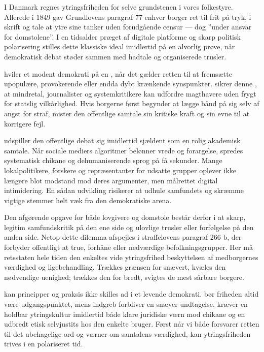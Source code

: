 I Danmark regnes ytringsfriheden for selve grundstenen i vores folkestyre. Allerede i 1849 gav Grundlovens paragraf 77 enhver borger ret til frit på tryk, i skrift og tale at ytre sine tanker uden forudgående censur --- dog ”under ansvar for domstolene”. I en tidsalder præget af digitale platforme og skarp politisk polarisering stilles dette klassiske ideal imidlertid på en alvorlig prøve, når demokratisk debat støder sammen med hadtale og organiserede trusler.

 hviler et modent demokrati på en , når det gælder retten til at fremsætte upopulære, provokerende eller endda dybt krænkende synspunkter.  sikrer denne , at mindretal, journalister og systemkritikere kan udfordre magthavere uden frygt for statslig vilkårlighed. Hvis borgerne først begynder at lægge bånd på sig selv af angst for straf, mister den offentlige samtale sin kritiske kraft og sin evne til at korrigere fejl.

 udspiller den offentlige debat sig imidlertid sjældent som en rolig akademisk samtale. Når sociale mediers algoritmer belønner vrede og forargelse, spredes systematisk chikane og dehumaniserende sprog på få sekunder. Mange lokalpolitikere, forskere og repræsentanter for udsatte grupper oplever ikke længere blot modstand mod deres argumenter, men målrettet digital intimidering. En sådan udvikling risikerer at udhule samfundets  og skræmme vigtige stemmer helt væk fra den demokratiske arena.

Den afgørende opgave for både lovgivere og domstole består derfor i at  skarp, legitim samfundskritik på den ene side og ulovlige trusler eller forfølgelse på den anden side. Netop dette dilemma afspejles i straffelovens paragraf 266 b, der forbyder offentligt at true, forhåne eller nedværdige befolkningsgrupper. Her må retsstaten hele tiden  den enkeltes vide ytringsfrihed  beskyttelsen af medborgernes værdighed og ligebehandling. Trækkes grænsen for snævert, kvæles den nødvendige uenighed; trækkes den for bredt, svigtes de mest sårbare borgere.

 kan principper og praksis ikke skilles ad i et levende demokrati.  bør friheden altid være udgangspunktet, mens indgreb forbliver en snæver undtagelse.  kræver en holdbar ytringskultur imidlertid både klare juridiske værn mod chikane og en udbredt etisk selvjustits hos den enkelte bruger. Først når vi både forsvarer retten til det ubehagelige ord og værner om samtalens værdighed, kan ytringsfriheden trives i en polariseret tid.

